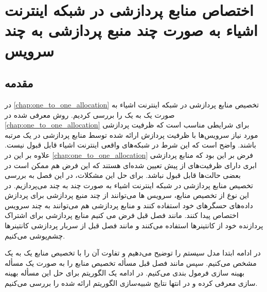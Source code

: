 \chapter{اختصاص منابع پردازشی در شبکه اینترنت اشیاء به صورت چند منبع پردازشی به چند سرویس}\label{chap:many_to_many_allocation}
  \thispagestyle{empty}
  \section{مقدمه}
    در \cref{chap:one_to_one_allocation} تخصیص منابع پردازشی در شبکه اینترنت اشیاء به صورت یک به یک را بررسی کردیم.
    روش معرفی شده در \cref{chap:one_to_one_allocation} برای شرایطی مناسب است که ظرفیت پردازشی مورد نیاز سرویس‌ها با ظرفیت پردازش ارائه شده توسط منابع پردازشی در یک مرتبه باشند.
    واضح است که این شرط در شبکه‌‌های واقعی اینترنت اشیاء قابل قبول نیست.
    علاوه بر این در \cref{chap:one_to_one_allocation} فرض بر این بود که منابع پردازشی ابری دارای ظرفیت‌های از پیش تعیین شده‌ای هستند که این فرض هم ممکن است در بعضی حالت‌ها قابل قبول نباشد.
    برای حل این مشکلات،‌ در این فصل به بررسی تخصیص منابع پردازشی در شبکه اینترنت اشیاء به صورت چند به چند می‌پردازیم.
    در این نوع از تخصیص منابع، سرویس ها می‌توانند از چند منبع پردازشی برای پردازش داده‌های حسگر‌های خود استفاده کنند و منابع پردازشی هم می‌توانند به چند سرویس اختصاص پیدا کنند.
    مانند فصل قبل فرض می کنیم منابع پردازشی برای اشتراک پردازنده خود از کانتینر‌ها استفاده می‌کنند و مانند فصل قبل از سربار پردازشی کانتینر‌ها چشم‌پوشی می‌کنیم.

    در ادامه ابتدا مدل سیستم را توضیح می‌دهیم و تفاوت آن را با تخصیص منابع یک به یک مشخص می‌کنیم.
    سپس مانند فصل قبل مسأله تخصیص منابع را به صورت یک مسأله بهینه سازی فرمول بندی می‌کنیم.
    در ادامه یک الگوریتم برای حل این مسأله بهینه سازی معرفی کرده و در انتها نتایج شبیه‌سازی الگوریتم ارائه شده را بررسی می‌کنیم.
